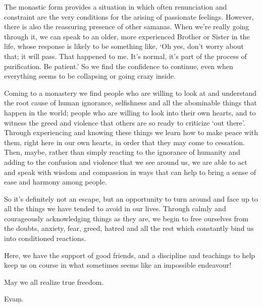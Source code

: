 The monastic form provides a situation in which often renunciation and constraint are the very conditions for the arising of passionate feelings. However, there is also the reassuring presence of other samanas. When we're really going through it, we can speak to an older, more experienced Brother or Sister in the life, whose response is likely to be something like, `Oh yes, don't worry about that; it will pass. That happened to me. It's normal, it's part of the process of purification. Be patient.' So we find the confidence to continue, even when everything seems to be collapsing or going crazy inside.

Coming to a monastery we find people who are willing to look at and understand the root cause of human ignorance, selfishness and all the abominable things that happen in the world; people who are willing to look into their own hearts, and to witness the greed and violence that others are so ready to criticize `out there'. Through experiencing and knowing these things we learn how to make peace with them, right here in our own hearts, in order that they may come to cessation. Then, maybe, rather than simply reacting to the ignorance of humanity and adding to the confusion and violence that we see around us, we are able to act and speak with wisdom and compassion in ways that can help to bring a sense of ease and harmony among people.

So it's definitely not an escape, but an opportunity to turn around and face up to all the things we have tended to avoid in our lives. Through calmly and courageously acknowledging things as they are, we begin to free ourselves from the doubts, anxiety, fear, greed, hatred and all the rest which constantly bind us into conditioned reactions.

Here, we have the support of good friends, and a discipline and teachings to help keep us on course in what sometimes seems like an impossible endeavour!

May we all realize true freedom.

Eva\d{m}.
